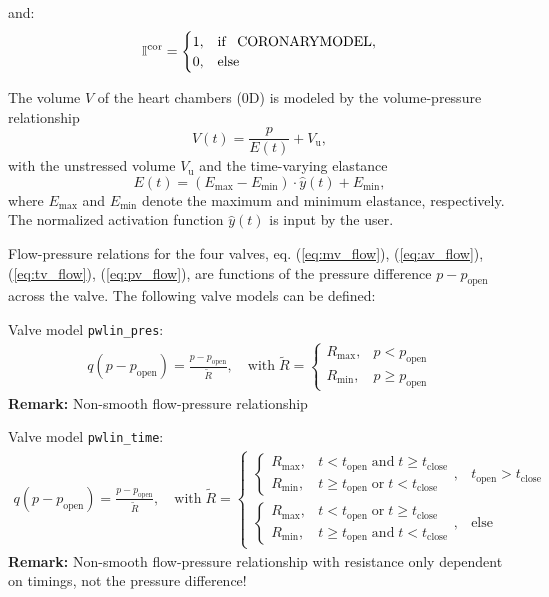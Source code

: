 \documentclass[a4paper,12pt]{report}
\begin{document}
and:
\begin{align}
\mathbb{I}^{\mathrm{cor}} = \begin{cases} 1, & \text{if \, CORONARYMODEL}, \\ 0, & \text{else} \end{cases}\nonumber
\end{align}

The volume $V$ of the heart chambers (0D) is modeled by the volume-pressure relationship
\begin{equation}
V(t) = \frac{p}{E(t)} + V_{\mathrm{u}},
\end{equation}
with the unstressed volume $V_{\mathrm{u}}$ and the time-varying elastance
\begin{equation}
E(t)=\left(E_{\mathrm{max}}-E_{\mathrm{min}}\right)\cdot \hat{y}(t)+E_{\mathrm{min}} \label{at_elast},
\end{equation}
where $E_{\mathrm{max}}$ and $E_{\mathrm{min}}$ denote the maximum and minimum elastance, respectively. The normalized activation function $\hat{y}(t)$ is input by the user.

Flow-pressure relations for the four valves, eq. (\ref{eq:mv_flow}), (\ref{eq:av_flow}), (\ref{eq:tv_flow}), (\ref{eq:pv_flow}), are functions of the pressure difference $p-p_{\mathrm{open}}$ across the valve. The following valve models can be defined:

Valve model \verb.pwlin_pres.:
\begin{align}
q(p-p_{\mathrm{open}}) = \frac{p-p_{\mathrm{open}}}{\tilde{R}}, \quad \text{with}\; \tilde{R} = \begin{cases} R_{\max}, & p < p_{\mathrm{open}} \\
R_{\min}, & p \geq p_{\mathrm{open}} \end{cases}\nonumber
\end{align}
\textbf{Remark:} Non-smooth flow-pressure relationship

Valve model \verb.pwlin_time.:
\begin{align}
q(p-p_{\mathrm{open}}) = \frac{p-p_{\mathrm{open}}}{\tilde{R}},\quad \text{with}\; \tilde{R} = \begin{cases} \begin{cases} R_{\max}, & t < t_{\mathrm{open}} \;\text{and}\; t \geq t_{\mathrm{close}} \\
R_{\min}, & t \geq t_{\mathrm{open}} \;\text{or}\; t < t_{\mathrm{close}} \end{cases}, & t_{\mathrm{open}} > t_{\mathrm{close}} \\ \begin{cases} R_{\max}, & t < t_{\mathrm{open}} \;\text{or}\; t \geq t_{\mathrm{close}} \\
R_{\min}, & t \geq t_{\mathrm{open}} \;\text{and}\; t < t_{\mathrm{close}} \end{cases}, & \text{else} \end{cases}\nonumber
\end{align}
\textbf{Remark:} Non-smooth flow-pressure relationship with resistance only dependent on timings, not the pressure difference!
\end{document}
